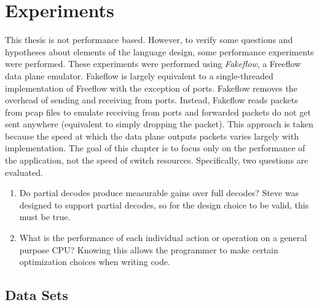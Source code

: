 \chapter{Experiments} \label{ch:experiments}


This thesis is not performance based. However, to verify some questions and hypotheses about elements of the language design, some performance experiments were performed.
These experiments were performed using \textit{Fakeflow}, a Freeflow data plane emulator. Fakeflow is largely equivalent to a single-threaded implementation of Freeflow with the exception of ports. Fakeflow removes the overhead of sending and receiving from ports. Instead, Fakeflow reads packets from pcap files to emulate receiving from ports and forwarded packets do not get sent anywhere (equivalent to simply dropping the packet). This approach is taken because the speed at which the data plane outputs packets varies largely with implementation. The goal of this chapter is to focus only on the performance of the application, not the speed of switch resources.
Specifically, two questions are evaluated.

\begin{enumerate}

\item Do partial decodes produce measurable gains over full decodes? Steve was designed to support partial decodes, so for the design choice to be valid, this must be true.

\item What is the performance of each individual action or operation on a general purpose CPU? Knowing this allows the programmer to make certain optimization choices when writing code.
\end{enumerate}

\section{Data Sets} \label{exp:use_cases}


